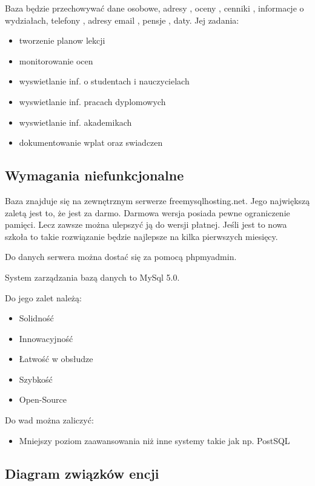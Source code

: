 \documentclass[12pt,a4paper]{article}
\begin{document}
Baza będzie przechowywać dane osobowe, adresy , oceny , cenniki , informacje o wydziałach, telefony , adresy email , pensje , daty.
Jej zadania:
\begin{itemize}
	\item tworzenie planow lekcji
	\item monitorowanie ocen
	\item wyswietlanie inf. o studentach i nauczycielach
	\item wyswietlanie inf. pracach dyplomowych
	\item wyswietlanie inf. akademikach
	\item dokumentowanie wplat oraz swiadczen
\end{itemize}

\subsection{Wymagania niefunkcjonalne}
\label{sec:NonFunctionalConditions}
Baza znajduje się na zewnętrznym serwerze freemysqlhosting.net.
Jego największą zaletą jest to, że jest za darmo.
Darmowa wersja posiada pewne ograniczenie pamięci.
Lecz zawsze można ulepszyć ją do wersji płatnej.
Jeśli jest to nowa szkoła to takie rozwiązanie będzie najlepsze na kilka pierwszych miesięcy.

Do danych serwera można dostać się za pomocą phpmyadmin.

System zarządzania bazą danych to MySql 5.0.

Do jego zalet należą: 
\begin{itemize}
	\item Solidność
	\item Innowacyjność
	\item Łatwość w obsłudze
	\item Szybkość
	\item Open-Source
\end{itemize}

Do wad można zaliczyć:

\begin{itemize}
	\item Mniejszy poziom zaawansowania niż inne systemy takie jak np. PostSQL
\end{itemize}

\subsection{Diagram związków encji}
\label{sec:ERD} 


\newpage

\newpage

\newpage

\end{document}
